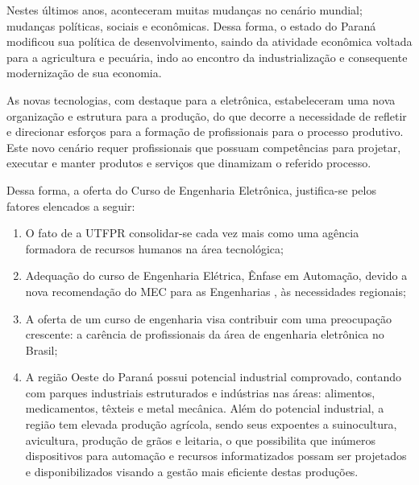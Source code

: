 
Nestes últimos anos, aconteceram muitas mudanças no cenário mundial; mudanças políticas, sociais e econômicas. Dessa forma, o estado do Paraná modificou sua política de desenvolvimento, saindo da atividade econômica voltada para a agricultura e pecuária, indo ao encontro da industrialização e consequente modernização de sua economia.

As novas tecnologias, com destaque para a eletrônica, estabeleceram uma nova organização e estrutura para a produção, do que decorre a necessidade de refletir e direcionar esforços para a formação de profissionais para o processo produtivo. Este novo cenário requer profissionais que possuam competências para projetar, executar e manter produtos e serviços que dinamizam o referido processo.

Dessa forma, a oferta do Curso de Engenharia Eletrônica, justifica-se pelos fatores elencados a seguir:

\begin{enumerate}
	
	\item O fato de a UTFPR consolidar-se cada vez mais como uma agência formadora de recursos humanos na área tecnológica;
	
	\item Adequação do curso de Engenharia Elétrica, Ênfase em Automação, devido a nova recomendação do MEC para as Engenharias , às necessidades regionais;
	
	\item A oferta de um curso de engenharia visa contribuir com uma preocupação crescente: a carência de profissionais da área de engenharia eletrônica no Brasil;
	
	\item A região Oeste do Paraná possui potencial industrial comprovado, contando com parques industriais estruturados e indústrias nas áreas: alimentos, medicamentos, têxteis e metal mecânica. Além do potencial industrial, a região tem elevada produção agrícola, sendo seus expoentes a suinocultura, avicultura, produção de grãos e leitaria, o que possibilita que inúmeros dispositivos para automação e recursos informatizados possam ser projetados e disponibilizados visando a gestão mais eficiente destas produções.
	
\end{enumerate}

